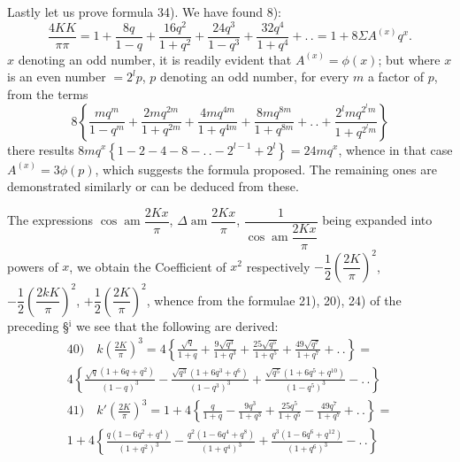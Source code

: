 \documentclass{article}
\begin{document}
Lastly let us prove formula 34). We have found 8):
\[
\frac{4KK}{\pi\pi}=1+\frac{8q}{1-q}+\frac{16q^{2}}{1+q^{2}}+\frac{24q^{3}}{1-q^{3}}+\frac{32q^{4}}{1+q^{4}}+.\,.=1+8\Sigma A^{(x)}q^{x}.
\]
$x$ denoting an odd number, it is readily evident that $A^{(x)}=\phi(x)$; but where $x$ is an even number $=2^{l}p$, $p$ denoting an odd number, for every $m$ a factor of $p$, from the terms
\[
8\left\{\frac{mq^{m}}{1-q^{m}}+\frac{2mq^{2m}}{1+q^{2m}}+\frac{4mq^{4m}}{1+q^{4m}}+\frac{8mq^{8m}}{1+q^{8m}}+.\,.+\frac{2^{l}mq^{2^{l}m}}{1+q^{2^{l}m}}\right\}
\]
there results $8mq^{x}\left\{1-2-4-8-.\,.-2^{l-1}+2^{l}\right\}=24mq^{x}$, whence in that case $A^{(x)}=3\phi(p)$, which suggests the formula proposed. The remaining ones are demonstrated similarly or can be deduced from these.

The expressions $\cos\operatorname{am}\dfrac{2Kx}{\pi}$, $\Delta\operatorname{am}\dfrac{2Kx}{\pi}$, $\dfrac{1}{\cos\operatorname{am}\dfrac{2Kx}{\pi}}$ being expanded into powers of $x$, we obtain the Coefficient of $x^{2}$ respectively $-\dfrac{1}{2}\left(\dfrac{2K}{\pi}\right)^{2}$, $-\dfrac{1}{2}\left(\dfrac{2kK}{\pi}\right)^{2}$, $+\dfrac{1}{2}\left(\dfrac{2K}{\pi}\right)^{2}$, whence from the formulae 21), 20), 24) of the preceding §$^{\mathrm{i}}$ we see that the following are derived:
\[
\begin{gathered}
\text{40)}\quad k\left(\frac{2K}{\pi}\right)^{3}=4\left\{\frac{\sqrt{q}}{1+q}+\frac{9\sqrt{q^{3}}}{1+q^{3}}+\frac{25\sqrt{q^{5}}}{1+q^{5}}+\frac{49\sqrt{q^{7}}}{1+q^{7}}+.\,.\right\}=\\[2ex]
4\left\{\frac{\sqrt{q}(1+6q+q^{2})}{(1-q)^{3}}-\frac{\sqrt{q^{3}}(1+6q^{3}+q^{6})}{(1-q^{3})^{3}}+\frac{\sqrt{q^{5}}(1+6q^{5}+q^{10})}{(1-q^{5})^{3}}-.\,.\right\}\\[2ex]
\text{41)}\quad k'\left(\frac{2K}{\pi}\right)^{3}=1+4\left\{\frac{q}{1+q}-\frac{9q^{3}}{1+q^{3}}+\frac{25q^{5}}{1+q^{5}}-\frac{49q^{7}}{1+q^{7}}+.\,.\right\}=\\[2ex]
1+4\left\{\frac{q(1-6q^{2}+q^{4})}{(1+q^{2})^{3}}-\frac{q^{2}(1-6q^{4}+q^{8})}{(1+q^{4})^{3}}+\frac{q^{3}(1-6q^{6}+q^{12})}{(1+q^{6})^{3}}-.\,.\right\}
\end{gathered}
\]
\end{document}
